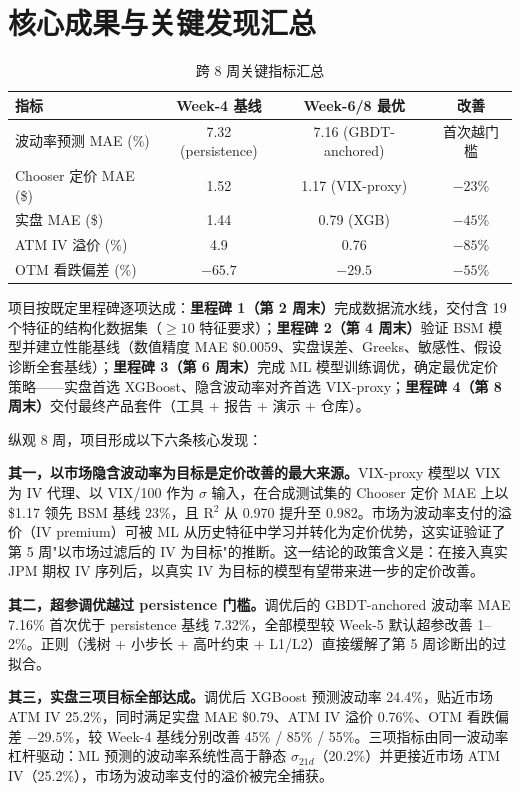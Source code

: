 \documentclass[11pt,a4paper]{article}
\begin{document}
\section{核心成果与关键发现汇总}

\begin{table}[H]
\centering
\caption{跨 8 周关键指标汇总}
\label{tab:summary}
\begin{tabular}{@{}lccc@{}}
\toprule
指标 & Week-4 基线 & Week-6/8 最优 & 改善 \\
\midrule
波动率预测 MAE (\%) & 7.32 (persistence) & 7.16 (GBDT-anchored) & 首次越门槛 \\
Chooser 定价 MAE (\$) & 1.52 & 1.17 (VIX-proxy) & $-23\%$ \\
实盘 MAE (\$) & 1.44 & 0.79 (XGB) & $-45\%$ \\
ATM IV 溢价 (\%) & 4.9 & 0.76 & $-85\%$ \\
OTM 看跌偏差 (\%) & $-65.7$ & $-29.5$ & $-55\%$ \\
\bottomrule
\end{tabular}
\end{table}

项目按既定里程碑逐项达成：\textbf{里程碑 1（第 2 周末）}完成数据流水线，交付含 19 个特征的结构化数据集（$\geq10$ 特征要求）；\textbf{里程碑 2（第 4 周末）}验证 BSM 模型并建立性能基线（数值精度 MAE \$0.0059、实盘误差、Greeks、敏感性、假设诊断全套基线）；\textbf{里程碑 3（第 6 周末）}完成 ML 模型训练调优，确定最优定价策略——实盘首选 XGBoost、隐含波动率对齐首选 VIX-proxy；\textbf{里程碑 4（第 8 周末）}交付最终产品套件（工具 + 报告 + 演示 + 仓库）。

纵观 8 周，项目形成以下六条核心发现：

\textbf{其一，以市场隐含波动率为目标是定价改善的最大来源。}VIX-proxy 模型以 VIX 为 IV 代理、以 VIX/100 作为 $\sigma$ 输入，在合成测试集的 Chooser 定价 MAE 上以 \$1.17 领先 BSM 基线 23\%，且 R$^2$ 从 0.970 提升至 0.982。市场为波动率支付的溢价（IV premium）可被 ML 从历史特征中学习并转化为定价优势，这实证验证了第 5 周"以市场过滤后的 IV 为目标"的推断。这一结论的政策含义是：在接入真实 JPM 期权 IV 序列后，以真实 IV 为目标的模型有望带来进一步的定价改善。

\textbf{其二，超参调优越过 persistence 门槛。}调优后的 GBDT-anchored 波动率 MAE 7.16\% 首次优于 persistence 基线 7.32\%，全部模型较 Week-5 默认超参改善 1--2\%。正则（浅树 + 小步长 + 高叶约束 + L1/L2）直接缓解了第 5 周诊断出的过拟合。

\textbf{其三，实盘三项目标全部达成。}调优后 XGBoost 预测波动率 24.4\%，贴近市场 ATM IV 25.2\%，同时满足实盘 MAE \$0.79、ATM IV 溢价 0.76\%、OTM 看跌偏差 $-29.5\%$，较 Week-4 基线分别改善 45\% / 85\% / 55\%。三项指标由同一波动率杠杆驱动：ML 预测的波动率系统性高于静态 $\sigma_{21d}$（20.2\%）并更接近市场 ATM IV（25.2\%），市场为波动率支付的溢价被完全捕获。
\end{document}
